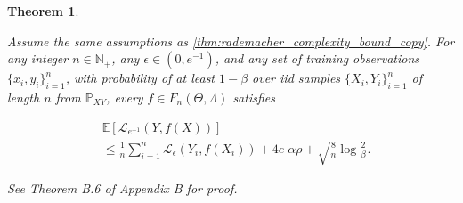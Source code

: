 \documentclass[twoside]{article}
\newtheorem{theorem}{Theorem}[section]
\newtheorem{lemma}[theorem]{Lemma}
\begin{document}
%			
%			
%			

		\begin{theorem}
			\label{thm:specific_expected_loss_bound_for_multiclass_conditional_embedding_copy}
			
			Assume the same assumptions as \cref{thm:rademacher_complexity_bound_copy}. For any integer $n \in \mathbb{N}_{+}$, any $\epsilon \in (0, e^{-1})$, and any set of training observations $\{x_{i}, y_{i}\}_{i = 1}^{n}$, with probability of at least $1 - \beta$ over \textit{iid} samples $\{X_{i}, Y_{i}\}_{i = 1}^{n}$ of length $n$ from $\mathbb{P}_{X Y}$, every $f \in F_{n}(\Theta, \Lambda)$ satisfies
			
			\begin{equation}
			\begin{aligned}
				&\mathbb{E}[\mathcal{L}_{e^{-1}}(Y, f(X))]  \\
				&\leq \frac{1}{n} \sum_{i = 1}^{n} \mathcal{L}_{\epsilon}(Y_{i}, f(X_{i})) + 4 e \; \alpha \rho + \sqrt{\frac{8}{n} \log{\frac{2}{\beta}}}.
			\end{aligned}
			\label{eq:specific_expected_loss_bound_for_multiclass_conditional_embedding_copy}
			\end{equation}
			
			See Theorem B.6 of Appendix B for proof.
		\end{theorem}
		
\end{document}
